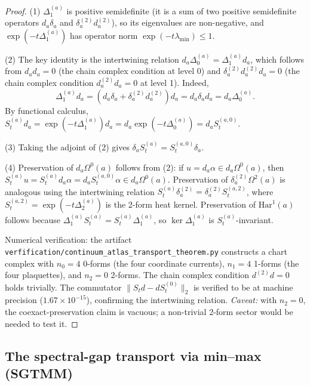 \begin{proof}
(1) $\Delta_{1}^{(a)}$ is positive semidefinite (it is a sum of two
positive semidefinite operators $d_{a} \delta_{a}$ and
$\delta_{a}^{(2)} d_{a}^{(2)}$), so its eigenvalues are
non-negative, and $\exp(-t \Delta_{1}^{(a)})$ has operator norm
$\exp(-t \lambda_{\min}) \le 1$.

(2) The key identity is the intertwining relation
$d_{a} \Delta_{0}^{(a)} = \Delta_{1}^{(a)} d_{a}$, which follows
from $d_{a} d_{a} = 0$ (the chain complex condition at level 0) and
$\delta_{a}^{(2)} d_{a}^{(2)} d_{a} = 0$ (the chain complex condition
$d_{a}^{(2)} d_{a} = 0$ at level 1). Indeed,
\[
\Delta_{1}^{(a)} d_{a} = (d_{a} \delta_{a} + \delta_{a}^{(2)}
d_{a}^{(2)}) d_{a} = d_{a} \delta_{a} d_{a} = d_{a}
\Delta_{0}^{(a)}.
\]
By functional calculus,
$S_{t}^{(a)} d_{a} = \exp(-t \Delta_{1}^{(a)}) d_{a} = d_{a}
\exp(-t \Delta_{0}^{(a)}) = d_{a} S_{t}^{(a,0)}$.

(3) Taking the adjoint of (2) gives
$\delta_{a} S_{t}^{(a)} = S_{t}^{(a,0)} \delta_{a}$.

(4) Preservation of $d_{a} \Omega^{0}(a)$ follows from (2): if $u =
d_{a} \alpha \in d_{a} \Omega^{0}(a)$, then
$S_{t}^{(a)} u = S_{t}^{(a)} d_{a} \alpha = d_{a} S_{t}^{(a,0)}
\alpha \in d_{a} \Omega^{0}(a)$.
Preservation of $\delta_{a}^{(2)} \Omega^{2}(a)$ is analogous using
the intertwining relation
$S_{t}^{(a)} \delta_{a}^{(2)} = \delta_{a}^{(2)} S_{t}^{(a,2)}$,
where $S_{t}^{(a,2)} = \exp(-t \Delta_{2}^{(a)})$ is the 2-form heat
kernel. Preservation of $\mathrm{Har}^{1}(a)$ follows because
$\Delta_{1}^{(a)} S_{t}^{(a)} = S_{t}^{(a)} \Delta_{1}^{(a)}$, so
$\ker \Delta_{1}^{(a)}$ is $S_{t}^{(a)}$-invariant.

Numerical verification: the artifact
\texttt{verfification/continuum\_atlas\_transport\_theorem.py}
constructs a chart complex with $n_{0} = 4$ 0-forms (the four
coordinate currents), $n_{1} = 4$ 1-forms (the four plaquettes),
and $n_{2} = 0$ 2-forms. The chain complex condition
$d^{(2)} d = 0$ holds trivially. The commutator
$\|S_{t} d - d S_{t}^{(0)}\|_{2}$ is verified to be at machine
precision ($1.67 \times 10^{-15}$), confirming the intertwining
relation. \emph{Caveat:} with $n_{2} = 0$, the coexact-preservation
claim is vacuous; a non-trivial 2-form sector would be needed to
test it.
\end{proof}

\subsection{The spectral-gap transport via min--max (SGTMM)}


